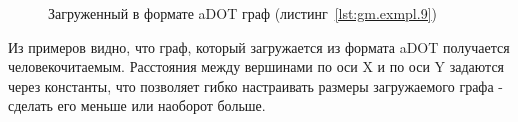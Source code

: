 \begin{figure}[ht!]
\caption{Загруженный в формате aDOT граф (листинг~\ref{lst:gm.exmpl.9})}
\label{fig:example_3}
\end{figure}

Из примеров видно, что граф, который загружается из формата aDOT получается человекочитаемым. Расстояния между вершинами по оси X и по оси Y задаются через константы, что позволяет гибко настраивать размеры загружаемого графа - сделать его меньше или наоборот больше.



